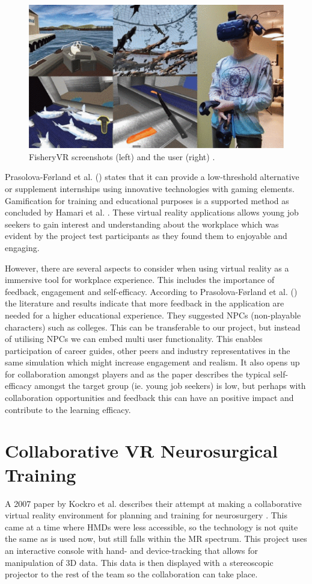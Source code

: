  \begin{figure}[!h]
     \centering
     \includegraphics[width=.7\textwidth]{./fig/related_work/fisheryVR.png}
     \caption{FisheryVR screenshots (left) and the user (right) \cite{prasolova2019empowering}.}
     \label{fig:FisheryVR}
 \end{figure}

Prasolova-Førland et al. (\citeyear{prasolova2019empowering}) states that it can provide a low-threshold alternative or supplement internships using innovative technologies with gaming elements. Gamification for training and educational purposes is a supported method as concluded by Hamari et al. \cite{hamari2014does}. These virtual reality applications allows young job seekers to gain interest and understanding about the workplace which was evident by the project test participants as they found them to enjoyable and engaging. 

However, there are several aspects to consider when using virtual reality as a immersive tool for workplace experience. This includes the importance of feedback, engagement and self-efficacy. According to Prasolova-Førland et al. (\citeyear{prasolova2019empowering}) the literature and results indicate that more feedback in the application are needed for a higher educational experience. They suggested NPCs (non-playable characters) such as colleges. This can be transferable to our project, but instead of utilising NPCs we can embed multi user functionality. This enables participation of career guides, other peers and industry representatives in the same simulation which might increase engagement and realism. It also opens up for collaboration amongst players and as the paper describes the typical self-efficacy amongst the target group (ie. young job seekers) is low, but perhaps with collaboration opportunities and feedback this can have an positive impact and contribute to the learning efficacy.  




\section{Collaborative VR Neurosurgical Training}
A 2007 paper by Kockro et al. describes their attempt at making a collaborative virtual reality environment for planning and training for neurosurgery \cite{kockro2007collaborative}. This came at a time where HMDs were less accessible, so the technology is not quite the same as is used now, but still falls within the MR spectrum. This project uses an interactive console with hand- and device-tracking that allows for manipulation of 3D data. This data is then displayed with a stereoscopic projector to the rest of the team so the collaboration can take place.


